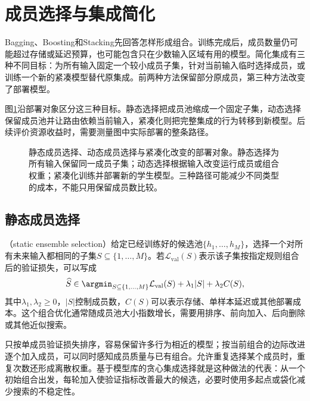 \section{成员选择与集成简化}
\label{sec:ensemble-selection-compression}

Bagging、Boosting和Stacking先回答怎样形成组合。训练完成后，成员数量仍可能超过存储或延迟预算，也可能包含只在少数输入区域有用的模型。简化集成有三种不同目标：为所有输入固定一个较小成员子集，针对当前输入临时选择成员，或训练一个新的紧凑模型替代原集成。前两种方法保留部分原成员，第三种方法改变了部署模型。

图\ref{fig:ensemble-selection-compression}沿部署对象区分这三种目标。静态选择把成员池缩成一个固定子集，动态选择保留成员池并让路由依赖当前输入，紧凑化则把完整集成的行为转移到新模型。后续评价资源收益时，需要测量图中实际部署的整条路径。

\begin{figure}[htbp]
  \centering
  
  \caption{静态成员选择、动态成员选择与紧凑化改变的部署对象。静态选择为所有输入保留同一成员子集；动态选择根据输入改变运行成员或组合权重；紧凑化训练并部署新的学生模型。三种路径可能减少不同类型的成本，不能只用保留成员数比较。}
  \label{fig:ensemble-selection-compression}
\end{figure}

\subsection{静态成员选择}
\label{sec:ensemble-static-selection}

（static ensemble selection）给定已经训练好的候选池$\{h_1,\ldots,h_M\}$，选择一个对所有未来输入都相同的子集$S\subseteq\{1,\ldots,M\}$。若$\mathcal{L}_{\mathrm{val}}(S)$表示该子集按指定规则组合后的验证损失，可以写成
\begin{equation}
  \widehat{S}
  \in
  \argmin_{S\subseteq\{1,\ldots,M\}}
  \mathcal{L}_{\mathrm{val}}(S)
  +\lambda_1|S|
  +\lambda_2 C(S),
  \label{eq:ensemble-static-selection}
\end{equation}
其中$\lambda_1,\lambda_2\geq0$，$|S|$控制成员数，$C(S)$可以表示存储、单样本延迟或其他部署成本。这个组合优化通常随成员池大小指数增长，需要用排序、前向加入、后向删除或其他近似搜索。

只按单成员验证损失排序，容易保留许多行为相近的模型；按当前组合的边际改进逐个加入成员，可以同时感知成员质量与已有组合。允许重复选择某个成员时，重复次数还形成离散权重。基于模型库的贪心集成选择就是这种做法的代表：从一个初始组合出发，每轮加入使验证指标改善最大的候选，必要时使用多起点或袋化减少搜索的不稳定性。


